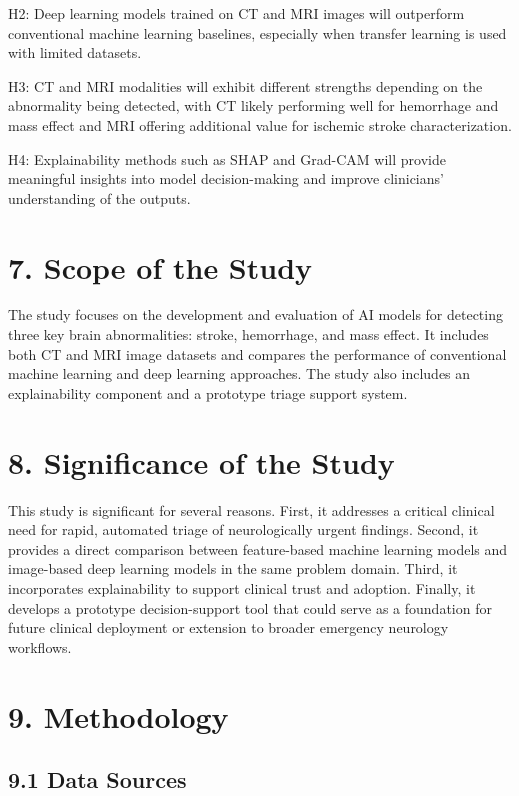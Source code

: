 \documentclass[12pt,a4paper]{report}
\begin{document}
H2: Deep learning models trained on CT and MRI images will outperform conventional machine learning baselines, especially when transfer learning is used with limited datasets.

H3: CT and MRI modalities will exhibit different strengths depending on the abnormality being detected, with CT likely performing well for hemorrhage and mass effect and MRI offering additional value for ischemic stroke characterization.

H4: Explainability methods such as SHAP and Grad-CAM will provide meaningful insights into model decision-making and improve clinicians' understanding of the outputs.


\section{7. Scope of the Study}

The study focuses on the development and evaluation of AI models for detecting three key brain abnormalities: stroke, hemorrhage, and mass effect. It includes both CT and MRI image datasets and compares the performance of conventional machine learning and deep learning approaches. The study also includes an explainability component and a prototype triage support system.


\section{8. Significance of the Study}

This study is significant for several reasons. First, it addresses a critical clinical need for rapid, automated triage of neurologically urgent findings. Second, it provides a direct comparison between feature-based machine learning models and image-based deep learning models in the same problem domain. Third, it incorporates explainability to support clinical trust and adoption. Finally, it develops a prototype decision-support tool that could serve as a foundation for future clinical deployment or extension to broader emergency neurology workflows.


\section{9. Methodology}

\subsection{9.1 Data Sources}
\end{document}
